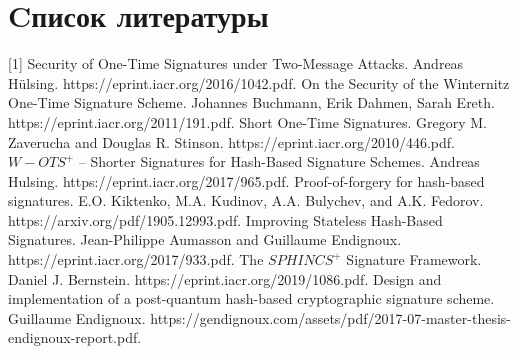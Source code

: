 \documentclass[a4paper, 14pt]{extarticle}
\begin{document}
\section{Cписок литературы}
[1] Security of One-Time Signatures under Two-Message Attacks. Andreas Hülsing. https://eprint.iacr.org/2016/1042.pdf.
\newline
\newline
[2] On the Security of the Winternitz One-Time Signature Scheme. Johannes Buchmann, Erik Dahmen, Sarah Ereth. https://eprint.iacr.org/2011/191.pdf.
\newline
\newline
[3] Short One-Time Signatures. Gregory M. Zaverucha and Douglas R. Stinson. https://eprint.iacr.org/2010/446.pdf.
\newline
\newline
[4] $W-OTS^{+}$ – Shorter Signatures for Hash-Based Signature Schemes. Andreas Hulsing. https://eprint.iacr.org/2017/965.pdf.
\newline
\newline
[5] Proof-of-forgery for hash-based signatures. E.O. Kiktenko, M.A. Kudinov, A.A. Bulychev, and A.K. Fedorov. https://arxiv.org/pdf/1905.12993.pdf.
\newline
\newline
[6] Improving Stateless Hash-Based Signatures. Jean-Philippe Aumasson and Guillaume Endignoux. https://eprint.iacr.org/2017/933.pdf.
\newline
\newline
[7] The $SPHINCS^{+}$ Signature Framework. Daniel J. Bernstein. https://eprint.iacr.org/2019/1086.pdf.
\newline
\newline
[8] Design and implementation of a post-quantum
hash-based cryptographic signature scheme. Guillaume Endignoux. https://gendignoux.com/assets/pdf/2017-07-master-thesis-endignoux-report.pdf.
\newpage

\end{document}

